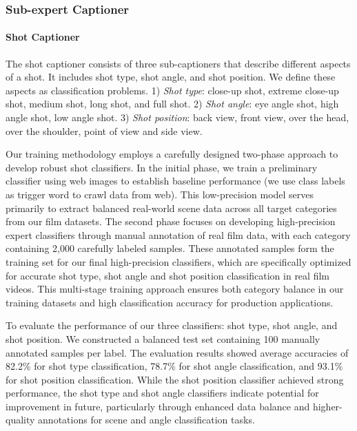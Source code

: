 \documentclass{article}
\begin{document}
{\subsubsection{Sub-expert Captioner}
\paragraph{Shot Captioner} The shot captioner consists of three sub-captioners that describe different aspects of a shot. It includes shot type, shot angle, and shot position. We define these aspects as classification problems. 1) \emph{Shot type}: close-up shot, extreme close-up shot, medium shot, long shot, and full shot. 2) \emph{Shot angle}: eye angle shot, high angle shot, low angle shot. 3) \emph{Shot position}: back view, front view, over the head, over the shoulder, point of view and side view.

Our training methodology employs a carefully designed two-phase approach to develop robust shot classifiers. In the initial phase, we train a preliminary classifier using web images to establish baseline performance (we use class labels as trigger word to crawl data from web). This low-precision model serves primarily to extract balanced real-world scene data across all target categories from our film datasets. The second phase focuses on developing high-precision expert classifiers through manual annotation of real film data, with each category containing 2,000 carefully labeled samples. These annotated samples form the training set for our final high-precision classifiers, which are specifically optimized for accurate shot type, shot angle and shot position classification in real film videos. This multi-stage training approach ensures both category balance in our training datasets and high classification accuracy for production applications.

To evaluate the performance of our three classifiers: shot type, shot angle, and shot position. We constructed a balanced test set containing 100 manually annotated samples per label. The evaluation results showed average accuracies of 82.2\% for shot type classification, 78.7\% for shot angle classification, and 93.1\% for shot position classification. While the shot position classifier achieved strong performance, the shot type and shot angle classifiers indicate potential for improvement in future, particularly through enhanced data balance and higher-quality annotations for scene and angle classification tasks.

}
\end{document}
